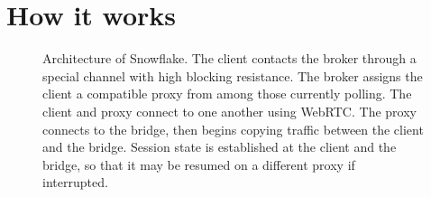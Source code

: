 \documentclass[letterpaper,twocolumn]{article}
\begin{document}

\section{How it works}
\label{sec:mechanics}

\begin{figure}[t]
\caption{
Architecture of Snowflake.
The client contacts the broker through a special channel with high blocking resistance.
The broker assigns the client a compatible proxy from among those currently polling.
The client and proxy connect to one another using WebRTC.
The proxy connects to the bridge,
then begins copying traffic between the client and the bridge.
Session state is established at the client and the bridge,
so that it may be resumed on a different proxy if interrupted.
}
\label{fig:architecture}
\end{figure}
\end{document}
